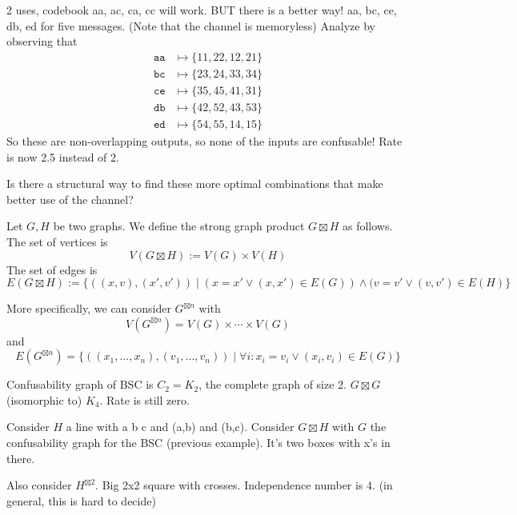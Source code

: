 \begin{example}
2 uses, codebook aa, ac, ca, cc will work. BUT there is a better way! {aa, bc, ce, db, ed} for five messages. (Note that the channel is memoryless)
Analyze by observing that
\begin{align*}
\mathtt{aa} &\mapsto \{11, 22, 12, 21\}\\ 
\mathtt{bc} &\mapsto \{23, 24, 33, 34\}\\
\mathtt{ce} &\mapsto \{35, 45, 41, 31\}\\
\mathtt{db} &\mapsto \{42, 52, 43, 53\}\\
\mathtt{ed} &\mapsto \{54, 55, 14, 15\} 
\end{align*}
So these are non-overlapping outputs, so none of the inputs are confusable!
Rate is now 2.5 instead of 2.
\end{example}

Is there a structural way to find these more optimal combinations that make better use of the channel?

\begin{definition}
Let $G, H$ be two graphs. We define the strong graph product $G \boxtimes H$ as follows. The set of vertices is
\[
V(G \boxtimes H) := V(G) \times V(H)
\]
The set of edges is
\[
E(G \boxtimes H) := \{((x,v),(x',v')) \mid (x = x' \vee (x,x') \in E(G)) \wedge (v=v' \vee (v,v') \in E(H)\}
\]
\end{definition}

More specifically, we can consider $G^{\boxtimes n}$ with
\[
V(G^{\boxtimes n}) = V(G) \times \cdots \times V(G)
\]
and
\[
E(G^{\boxtimes n}) = \{((x_1, ..., x_n),(v_1, ..., v_n))  \mid \forall i : x_i = v_i \vee (x_i,v_i) \in E(G)\}
\]



\begin{example}
Confusability graph of BSC is $C_2 = K_2$, the complete graph of size 2.
$G \boxtimes G$ (isomorphic to) $K_4$.
Rate is still zero.
\end{example}

\begin{example}
Consider $H$ a line with a b c and (a,b) and (b,c). Consider $G \boxtimes H$ with $G$ the confusability graph for the BSC (previous example). It's two boxes with x's in there.

Also consider $H^{\boxtimes 2}$. Big 2x2 square with crosses.
Independence number is 4. (in general, this is hard to decide)
\end{example}


